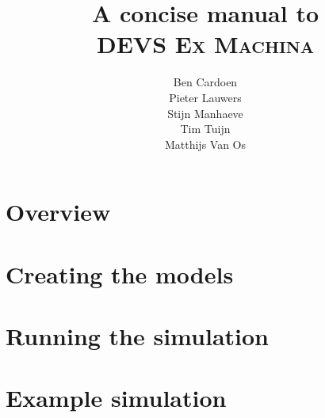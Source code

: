 \documentclass[10pt,a4paper]{report}
\title{A concise manual to\\\textsc{DEVS Ex Machina}}
\author{Ben Cardoen\\Pieter Lauwers\\Stijn Manhaeve\\Tim Tuijn\\Matthijs Van Os}
\date{}
\begin{document}
\maketitle
\tableofcontents{}

\chapter{Overview}


\chapter{Creating the models}


\chapter{Running the simulation}


\appendix
\chapter{Example simulation}
\end{document}
